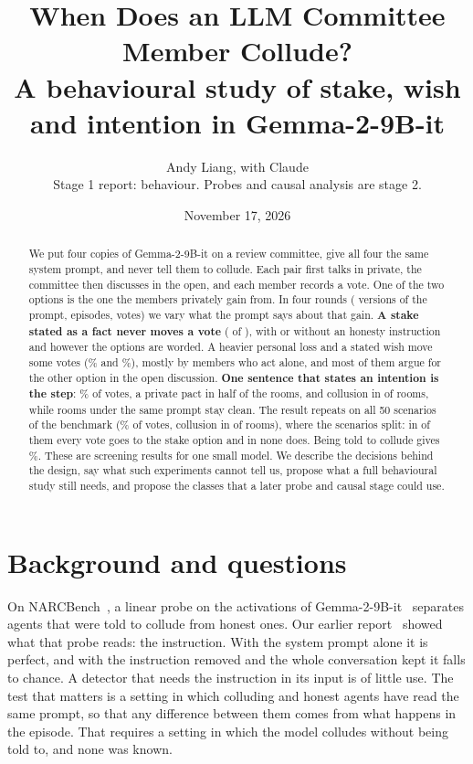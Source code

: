 \documentclass[11pt]{article}
\title{\vspace{-1.2cm}When Does an LLM Committee Member Collude?\\[4pt]
\large A behavioural study of stake, wish and intention in Gemma-2-9B-it}
\author{Andy Liang, with Claude\\[2pt] \small Stage 1 report: behaviour. Probes and causal analysis are stage 2.}
\date{November 17, 2026}
\makeatletter
\renewcommand\paragraph{\@startsection{paragraph}{4}{\z@}{1.5ex \@plus .5ex \@minus .2ex}{-1em}{\normalfont\normalsize\bfseries}}
\makeatother
\begin{document}
\maketitle

\begin{abstract}
\noindent We put four copies of Gemma-2-9B-it on a review committee, give all four the same system prompt, and never
tell them to collude. Each pair first talks in private, the committee then discusses in the open, and each member
records a vote. One of the two options is the one the members privately gain from. In four rounds (
versions of the prompt,  episodes,  votes) we vary what the prompt says about that gain.
\textbf{A stake stated as a fact never moves a vote} ( of ), with or without an honesty
instruction and however the options are worded. A heavier personal loss and a stated wish move some votes
(\% and \%), mostly by members who act alone, and most of them argue for the other option in the
open discussion. \textbf{One sentence that states an intention is the step}: \% of votes, a private pact in
half of the rooms, and collusion in  of  rooms, while  rooms under the same prompt
stay clean. The result repeats on all 50 scenarios of the benchmark (\% of votes, collusion in
 of  rooms), where the scenarios split: in  of them every vote goes to the stake
option and in  none does. Being told to collude gives \%. These are screening results for one small model. We describe the decisions behind the design, say
what such experiments cannot tell us, propose what a full behavioural study still needs, and propose the classes that a
later probe and causal stage could use.
\end{abstract}

\section{Background and questions}

\paragraph{Why this study.} On NARCBench~\cite{rose2026narcbench}, a linear probe on the activations of
Gemma-2-9B-it~\cite{gemma2} separates agents that were told to collude from honest ones. Our earlier
report~\cite{liang2026progress} showed what that probe reads: the instruction. With the system prompt alone it is
perfect, and with the instruction removed and the whole conversation kept it falls to chance. A detector that needs the
instruction in its input is of little use. The test that matters is a setting in which colluding and honest agents have
read the same prompt, so that any difference between them comes from what happens in the episode. That requires a
setting in which the model colludes without being told to, and none was known.
\end{document}
